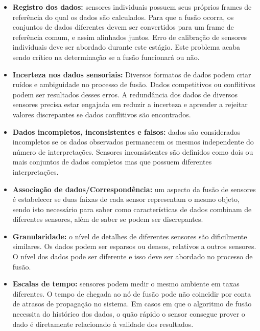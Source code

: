 \documentclass[acronym, symbols, table]{fei}
\begin{document}
			\begin{itemize}
				\item \textbf{Registro dos dados:} sensores individuais possuem seus próprios frames de referência do qual os dados são calculados. Para que a fusão ocorra, os conjuntos de dados diferentes devem ser convertidos para um frame de referência comum, e assim alinhados juntos. Erro de calibração de sensores individuais deve ser abordado durante este estágio. Este problema acaba sendo crítico na determinação se a fusão funcionará ou não.
				
				\item \textbf{Incerteza nos dados sensoriais:} Diversos formatos de dados podem criar ruídos e ambiguidade no processo de fusão. Dados competitivos ou conflitivos podem ser resultados desses erros. A redundância dos dados de diversos sensores precisa estar engajada em reduzir a incerteza e aprender a rejeitar valores discrepantes se dados conflitivos são encontrados.
				
				\item \textbf{Dados incompletos, inconsistentes e falsos:} dados são considerados incompletos se os dados observados permanecem os mesmos independente do número de interpretações. Sensores inconsistentes são definidos como dois ou mais conjuntos de dados completos mas que possuem diferentes interpretações.
				
				\item \textbf{Associação de dados/Correspondência:} um aspecto da fusão de sensores é estabelecer se duas faixas de cada sensor representam o mesmo objeto, sendo isto necessário para saber como características de dados combinam de diferentes sensores, além de saber se podem ser discrepantes. 
				
				\item \textbf{Granularidade:} o nível de detalhes de diferentes sensores são dificilmente similares. Os dados podem ser esparsos ou densos, relativos a outros sensores. O nível dos dados pode ser diferente e isso deve ser abordado no processo de fusão.
				
				\item \textbf{Escalas de tempo:} sensores podem medir o mesmo ambiente em taxas diferentes. O tempo de chegada ao nó de fusão pode não coincidir por conta de atrasos de propagação no sistema. Em casos em que o algoritmo de fusão necessita do histórico dos dados, o quão rápido o sensor consegue prover o dado é diretamente relacionado à validade dos resultados.
			\end{itemize}
		
\end{document}
